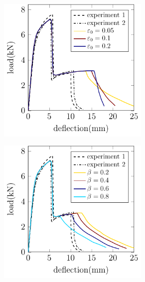\begin{frame}
  \begin{columns}[T]
    \begin{column}{0.6\textwidth}
      \vspace{-1em}
      \begin{figure}
        \centering
        \begin{subfigure}{0.32\linewidth}
          \centering
          \includegraphics[width=0.8\textwidth]{Chapter345/figures/Chapter5-3pb-load_deflection-constant_beta}
        \end{subfigure}
        \begin{subfigure}{0.32\linewidth}
          \centering
          \includegraphics[width=0.8\textwidth]{Chapter345/figures/Chapter5-3pb-load_deflection-constant_e0}

\end{subfigure}
\end{figure}
\end{column}
\end{columns}
\end{frame}
